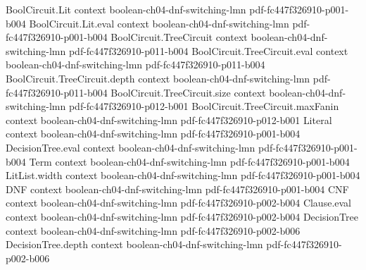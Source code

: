 \begin{theorem}
\label{LMN.odonnell_lemma_4_28}
\leanok
{}
\proofstep
  {BoolCircuit.Lit}
  {context}
  {boolean-ch04-dnf-switching-lmn}
  {pdf-fc447f326910-p001-b004}
\proofstep
  {BoolCircuit.Lit.eval}
  {context}
  {boolean-ch04-dnf-switching-lmn}
  {pdf-fc447f326910-p001-b004}
\proofstep
  {BoolCircuit.TreeCircuit}
  {context}
  {boolean-ch04-dnf-switching-lmn}
  {pdf-fc447f326910-p011-b004}
\proofstep
  {BoolCircuit.TreeCircuit.eval}
  {context}
  {boolean-ch04-dnf-switching-lmn}
  {pdf-fc447f326910-p011-b004}
\proofstep
  {BoolCircuit.TreeCircuit.depth}
  {context}
  {boolean-ch04-dnf-switching-lmn}
  {pdf-fc447f326910-p011-b004}
\proofstep
  {BoolCircuit.TreeCircuit.size}
  {context}
  {boolean-ch04-dnf-switching-lmn}
  {pdf-fc447f326910-p012-b001}
\proofstep
  {BoolCircuit.TreeCircuit.maxFanin}
  {context}
  {boolean-ch04-dnf-switching-lmn}
  {pdf-fc447f326910-p012-b001}
\proofstep
  {Literal}
  {context}
  {boolean-ch04-dnf-switching-lmn}
  {pdf-fc447f326910-p001-b004}
\proofstep
  {DecisionTree.eval}
  {context}
  {boolean-ch04-dnf-switching-lmn}
  {pdf-fc447f326910-p001-b004}
\proofstep
  {Term}
  {context}
  {boolean-ch04-dnf-switching-lmn}
  {pdf-fc447f326910-p001-b004}
\proofstep
  {LitList.width}
  {context}
  {boolean-ch04-dnf-switching-lmn}
  {pdf-fc447f326910-p001-b004}
\proofstep
  {DNF}
  {context}
  {boolean-ch04-dnf-switching-lmn}
  {pdf-fc447f326910-p001-b004}
\proofstep
  {CNF}
  {context}
  {boolean-ch04-dnf-switching-lmn}
  {pdf-fc447f326910-p002-b004}
\proofstep
  {Clause.eval}
  {context}
  {boolean-ch04-dnf-switching-lmn}
  {pdf-fc447f326910-p002-b004}
\proofstep
  {DecisionTree}
  {context}
  {boolean-ch04-dnf-switching-lmn}
  {pdf-fc447f326910-p002-b006}
\proofstep
  {DecisionTree.depth}
  {context}
  {boolean-ch04-dnf-switching-lmn}
  {pdf-fc447f326910-p002-b006}

\end{theorem}
